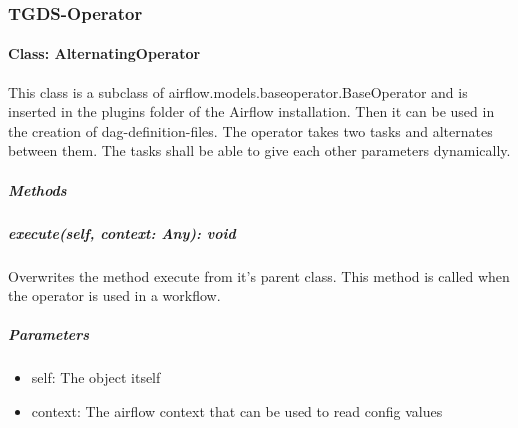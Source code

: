 \subsubsection{TGDS-Operator}

\paragraph{Class: AlternatingOperator}
This class is a subclass of airflow.models.baseoperator.BaseOperator and is inserted in the plugins folder of the Airflow installation. Then it can be used in the creation of dag-definition-files. The operator takes two tasks and alternates between them. The tasks shall be able to give each other parameters dynamically.
\subparagraph{Methods}

\subparagraph{execute(self, context: Any): void}
Overwrites the method execute from it's parent class. This method is called when the operator is used in a workflow. 

\subparagraph{Parameters}
\begin{itemize}
	\item{self:}
	The object itself
	\item{context:}
	The airflow context that can be used to read config values
\end{itemize}
